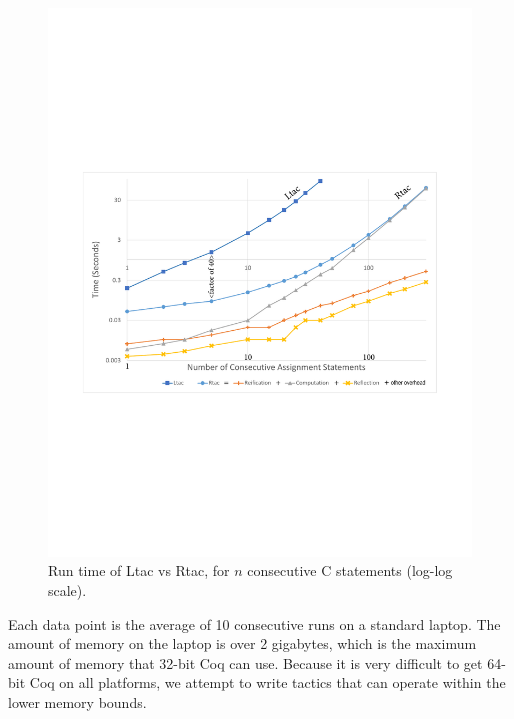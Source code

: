 \documentclass{puthesis}
\begin{document}
\begin{figure}
\vspace{-2ex}
\includegraphics[width=\textwidth]{chart.pdf}
\vspace{-4ex}
\caption{Run time of Ltac vs Rtac, for $n$ consecutive C statements (log-log scale).}
\label{fig:chart}
\vspace{-4ex}
\end{figure}

Each data point is the average of 10 consecutive runs on a standard laptop. The
amount of memory on the laptop is over 2 gigabytes, which is the
maximum amount of memory that 32-bit Coq can use. Because it is very
difficult to get 64-bit Coq on all platforms, we attempt to write
tactics that can operate within the lower memory bounds.
\end{document}
